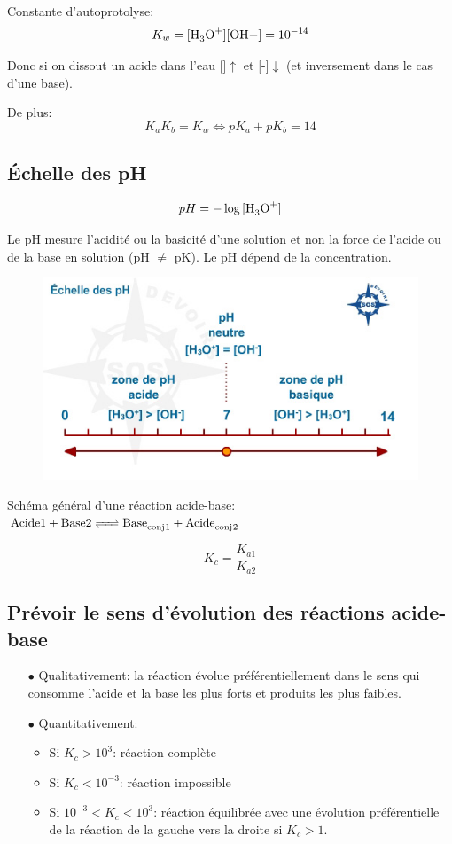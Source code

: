 \documentclass[11pt,a4paper,french]{article}
\begin{document}
Constante d'autoprotolyse: $$K_w=[\ce{H3O+}][\ce{OH}-]=10^{-14}$$

Donc si on dissout un acide dans l'eau []$\uparrow$ et [-]$\downarrow$ (et inversement dans le cas d'une base).

De plus: $$K_aK_b=K_w \Leftrightarrow pK_a+pK_b=14$$

\subsection{\'Echelle des pH}

$$pH=-\log{[\ce{H3O+}]}$$

Le pH mesure l'acidité ou la basicité d'une solution et non la force de l'acide ou de la base en solution (pH $\neq$ pK).
Le pH dépend de la concentration.
\begin{figure}[ht!]
\centering
\includegraphics[scale=0.5]{echelle_ph.jpg}
\end{figure}

Schéma général d'une réaction acide-base: $\ce{Acide 1 + Base 2 <=> Base_{conj}1 + Acide_{conj}2}$

$$K_c=\frac{K_{a1}}{K_{a2}}$$

\subsection{Prévoir le sens d'évolution des réactions acide-base}

\begin{itemize}
\item[$\bullet$] Qualitativement: la réaction évolue préférentiellement dans le sens qui consomme l'acide et la base les plus forts et produits les plus faibles.
\item[$\bullet$] Quantitativement:
	\begin{itemize}
	\item Si $K_c>10^3$: réaction complète
	\item Si $K_c<10^{-3}$: réaction impossible
	\item Si $10^{-3}<K_c<10^3$: réaction équilibrée avec une évolution préférentielle de la réaction de la gauche vers la droite si $K_c>1$.
	\end{itemize}
\end{itemize}
\end{document}
